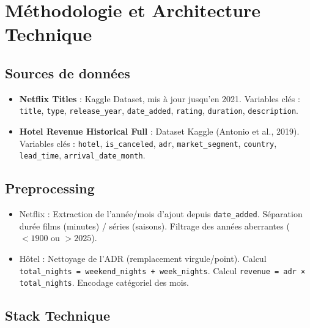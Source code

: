 \documentclass[12pt,a4paper]{article}
\begin{document}
\newpage

\section{Méthodologie et Architecture Technique}

\subsection{Sources de données}

\begin{itemize}
  \item \textbf{Netflix Titles} : Kaggle Dataset, mis à jour jusqu'en 2021. Variables clés : \texttt{title}, \texttt{type}, \texttt{release\_year}, \texttt{date\_added}, \texttt{rating}, \texttt{duration}, \texttt{description}.
  \item \textbf{Hotel Revenue Historical Full} : Dataset Kaggle (Antonio et al., 2019). Variables clés : \texttt{hotel}, \texttt{is\_canceled}, \texttt{adr}, \texttt{market\_segment}, \texttt{country}, \texttt{lead\_time}, \texttt{arrival\_date\_month}.
\end{itemize}

\subsection{Preprocessing}

\begin{itemize}
  \item Netflix : Extraction de l'année/mois d'ajout depuis \texttt{date\_added}. Séparation durée films (minutes) / séries (saisons). Filtrage des années aberrantes ($< 1900$ ou $> 2025$).
  \item Hôtel : Nettoyage de l'ADR (remplacement virgule/point). Calcul \texttt{total\_nights = weekend\_nights + week\_nights}. Calcul \texttt{revenue = adr × total\_nights}. Encodage catégoriel des mois.
\end{itemize}

\subsection{Stack Technique}
\end{document}
